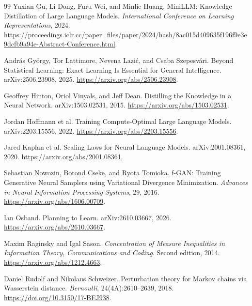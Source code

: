 \documentclass[11pt,twoside]{article}
\theoremstyle{definition}
\theoremstyle{remark}
\begin{document}
\begin{thebibliography}{99}
Yuxian Gu, Li Dong, Furu Wei, and Minlie Huang.
\newblock MiniLLM: Knowledge Distillation of Large Language Models.
\newblock \emph{International Conference on Learning Representations}, 2024.
\newblock \url{https://proceedings.iclr.cc/paper_files/paper/2024/hash/8ac015d409635f196f9e3e9dcfb9a94e-Abstract-Conference.html}.

Andr\'as Gy\"orgy, Tor Lattimore, Nevena Lazi\'c, and Csaba Szepesv\'ari.
\newblock Beyond Statistical Learning: Exact Learning Is Essential
for General Intelligence.
\newblock arXiv:2506.23908, 2025.
\newblock \url{https://arxiv.org/abs/2506.23908}.

Geoffrey Hinton, Oriol Vinyals, and Jeff Dean.
\newblock Distilling the Knowledge in a Neural Network.
\newblock arXiv:1503.02531, 2015.
\newblock \url{https://arxiv.org/abs/1503.02531}.

Jordan Hoffmann et al.
\newblock Training Compute-Optimal Large Language Models.
\newblock arXiv:2203.15556, 2022.
\newblock \url{https://arxiv.org/abs/2203.15556}.

Jared Kaplan et al.
\newblock Scaling Laws for Neural Language Models.
\newblock arXiv:2001.08361, 2020.
\newblock \url{https://arxiv.org/abs/2001.08361}.

Sebastian Nowozin, Botond Cseke, and Ryota Tomioka.
\newblock f-GAN: Training Generative Neural Samplers using Variational
Divergence Minimization.
\newblock \emph{Advances in Neural Information Processing Systems}, 29, 2016.
\newblock \url{https://arxiv.org/abs/1606.00709}.

Ian Osband.
\newblock Planning to Learn.
\newblock arXiv:2610.03667, 2026.
\newblock \url{https://arxiv.org/abs/2610.03667}.

Maxim Raginsky and Igal Sason.
\newblock \emph{Concentration of Measure Inequalities in Information
Theory, Communications and Coding}.
\newblock Second edition, 2014.
\newblock \url{https://arxiv.org/abs/1212.4663}.

Daniel Rudolf and Nikolaus Schweizer.
\newblock Perturbation theory for Markov chains via Wasserstein distance.
\newblock \emph{Bernoulli}, 24(4A):2610--2639, 2018.
\newblock \url{https://doi.org/10.3150/17-BEJ938}.


\end{thebibliography}
\end{document}
